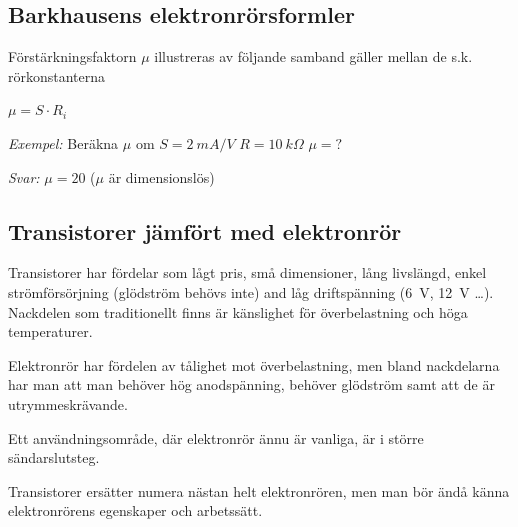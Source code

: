 \subsection{Barkhausens elektronrörsformler}

Förstärkningsfaktorn \(\mu \) illustreras av följande samband gäller mellan de s.k. rörkonstanterna

\(\mu = S \cdot R_i\)

\emph{Exempel:}
Beräkna \(\mu\)  om \(S = 2\ mA/V\) \(R = 10\ k\Omega\) \(\mu = ?\)

\emph{Svar:} \(\mu = 20\) (\(\mu\)  är dimensionslös)

\subsection{Transistorer jämfört med elektronrör}

Transistorer har fördelar som lågt pris, små dimensioner, lång livslängd,
enkel strömförsörjning (glödström behövs inte) and låg driftspänning (6~V,
12~V \ldots ). Nackdelen som traditionellt finns är känslighet för
överbelastning och höga temperaturer.

Elektronrör har fördelen av tålighet mot överbelastning, men bland nackdelarna
har man att man behöver hög anodspänning, behöver glödström samt att de är
utrymmeskrävande.

Ett användningsområde, där elektronrör ännu är vanliga, är i större
sändarslutsteg.

Transistorer ersätter numera nästan helt elektronrören, men man bör ändå känna
elektronrörens egenskaper och arbetssätt.
